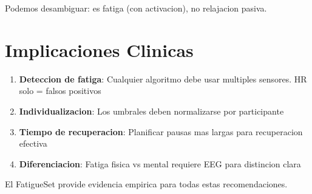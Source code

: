 Podemos desambiguar: es fatiga (con activacion), no relajacion pasiva.

\section{Implicaciones Clinicas}

\begin{enumerate}
    \item \textbf{Deteccion de fatiga}: Cualquier algoritmo debe usar multiples sensores. HR solo = falsos positivos
    \item \textbf{Individualizacion}: Los umbrales deben normalizarse por participante
    \item \textbf{Tiempo de recuperacion}: Planificar pausas mas largas para recuperacion efectiva
    \item \textbf{Diferenciacion}: Fatiga fisica vs mental requiere EEG para distincion clara
\end{enumerate}

El FatigueSet provide evidencia empirica para todas estas recomendaciones.
